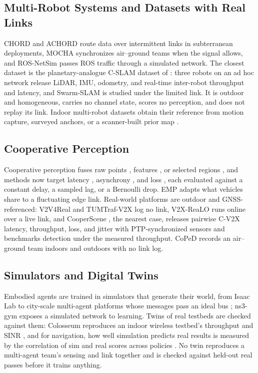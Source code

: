 \subsection{Multi-Robot Systems and Datasets with Real Links}
CHORD and ACHORD \cite{ginting2021chord,saboia2022achord} route data over
intermittent links in subterranean deployments, MOCHA
\cite{cladera2024mocha} synchronizes air--ground teams when the signal
allows, and ROS-NetSim \cite{calvofullana2021rosnetsim} passes ROS
traffic through a simulated network. The closest dataset is the
planetary-analogue C-SLAM dataset of \cite{planetary_cslam}: three
robots on an ad hoc network release LiDAR, IMU, odometry, and real-time
inter-robot throughput and latency, and Swarm-SLAM is studied under the
limited link. It is outdoor and homogeneous, carries no channel state,
scores no perception, and does not replay its link. Indoor multi-robot
datasets obtain their reference from motion capture, surveyed anchors,
or a scanner-built prior map \cite{utias,hilti2022,airmuseum,subtmrs}.

\subsection{Cooperative Perception}
Cooperative perception fuses raw points \cite{chen2019cooper}, features
\cite{chen2019fcooper,wang2020v2vnet}, or selected regions
\cite{where2comm}, and methods now target latency
\cite{lei2022syncnet,v2xvit}, asynchrony \cite{wei2023cobevflow}, and
loss \cite{ren2024v2xincop}, each evaluated against a constant delay, a
sampled lag, or a Bernoulli drop. EMP \cite{zhang2021emp} adapts what
vehicles share to a fluctuating edge link. Real-world platforms are
outdoor and GNSS-referenced: V2V4Real \cite{v2v4real} and TUMTraf-V2X
\cite{zimmer2024tumtrafv2x} log no link, V2X-ReaLO \cite{v2xrealo} runs
online over a live link, and CooperScene \cite{cooperscene}, the nearest
case, releases pairwise C-V2X latency, throughput, loss, and jitter with
PTP-synchronized sensors and benchmarks detection under the measured
throughput. CoPeD \cite{coped} records an air--ground team indoors and
outdoors with no link log.

\subsection{Simulators and Digital Twins}
Embodied agents are trained in simulators that generate their world,
from Isaac Lab \cite{orbit} to city-scale multi-agent platforms whose
messages pass an ideal bus \cite{lingjing}; ns3-gym \cite{ns3gym} exposes
a simulated network to learning. Twins of real testbeds are checked
against them: Colosseum reproduces an indoor wireless testbed's
throughput and SINR \cite{villa2024colosseumdt}, and for navigation, how
well simulation predicts real results is measured by the correlation of
sim and real scores across policies \cite{kadian2020sim2real}. No twin
reproduces a multi-agent team's sensing and link together and is checked
against held-out real passes before it trains anything.

